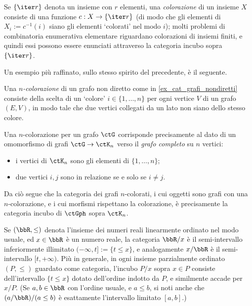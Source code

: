 \begin{example}\label{ex_set_colorati}
	Se \(\{\iter r\}\) denota un insieme con \(r\) elementi, una \emph{colorazione} di un insieme \(X\) consiste di una funzione \(c : X \to \{\iter r\}\) (di modo che gli elementi di \(X_i := c^{-1}(i)\) siano gli elementi `colorati' nel modo \(i\)); molti problemi di combinatoria enumerativa elementare riguardano colorazioni di insiemi finiti, e quindi essi possono essere enunciati attraverso la categoria incubo sopra \(\{\iter r\}\).
\end{example}
Un esempio più raffinato, sullo stesso spirito del precedente, è il seguente.
\begin{example}
	Una \emph{$n$-colorazione} di un grafo non diretto come in \ref{ex_cat_grafi_nondiretti} consiste della scelta di un `colore' $i\in\{1,\dots,n\}$ per ogni vertice $V$ di un grafo $(E,V)$, in modo tale che due vertici collegati da un lato non siano dello stesso colore.

	Una $n$-colorazione per un grafo $\ctG$ corrisponde precisamente al dato di un omomorfismo di grafi $\ctG\to\ctK_n$ verso il \emph{grafo completo} su $n$ vertici:
	\begin{itemize}
		\item i vertici di $\ctK_n$ sono gli elementi di $\{1,\dots,n\}$;
		\item due vertici $i,j$ sono in relazione se e solo se $i\ne j$.
	\end{itemize}
	Da ciò segue che la categoria dei grafi $n$-colorati, i cui oggetti sono grafi con una $n$-colorazione, e i cui morfismi rispettano la colorazione, è precisamente la categoria incubo di $\ctGph$ sopra $\ctK_n$.
\end{example}
\begin{example}[Intervalli]\label{ex_pos_slices}
	Se \((\bbR,\le)\) denota l'insieme dei numeri reali linearmente ordinato nel modo usuale, ed \(x\in\bbR\) è un numero reale, la categoria \(\bbR/x\) è il semi-intervallo inferiormente illimitato \((-\infty,t]:=\{t\le x\}\), e analogamente \(x/\bbR\) è il semi-intervallo \([t,+\infty)\). Più in generale, in ogni insieme parzialmente ordinato \((P,\le)\) guardato come categoria, l'incubo \(P/x\) sopra \(x\in P\) consiste dell'intervallo \(\{t\le x\}\) dotato dell'ordine indotto da \(P\), e similmente accade per \(x/P\). (Se \(a,b\in\bbR\) con l'ordine usuale, e \(a\le b\), si noti anche che \((a/\bbR)/(a\le b)\) è esattamente l'intervallo limitato \([a,b]\).)
\end{example}
